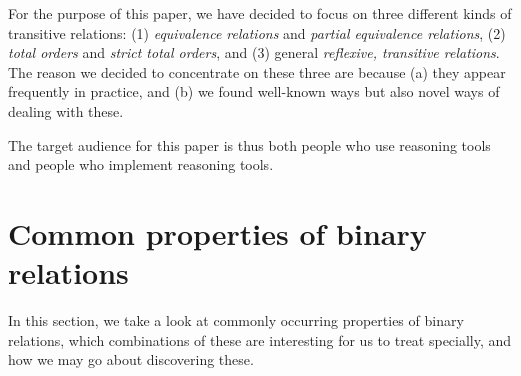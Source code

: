 \documentclass{article}
\begin{document}
For the purpose of this paper, we have decided to focus on three different kinds of transitive relations: (1) {\em equivalence relations} and {\em partial equivalence relations}, (2) {\em total orders} and {\em strict total orders}, and (3) general {\em reflexive, transitive relations}. The reason we decided to concentrate on these three are because (a) they appear frequently in practice, and (b) we found well-known ways but also novel ways of dealing with these.

The target audience for this paper is thus both people who use reasoning tools and people who implement reasoning tools.


\section{Common properties of binary relations} \label{sec:properties}

In this section, we take a look at commonly occurring properties of binary relations, which combinations of these are interesting for us to treat specially, and how we may go about discovering these.
\end{document}
